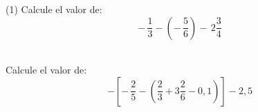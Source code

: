 \documentclass[]{srs}
\begin{document}
\begin{preguntas}(1)
  \pregunta Calcule el valor de:\\[-5pt]
  \begin{equation*}
   -\,\dfrac{1}{3} - \left(-\,\dfrac{5}{6}\right) -\,2\dfrac{3}{4}
  \end{equation*}\\[-20pt]
  \begin{malla}[height=9cm]
  \end{malla}
  \pregunta Calcule el valor de:\\[-5pt]
  \begin{equation*}
    -\left[-\,\dfrac{2}{5}-\left(\dfrac{2}{3} + 3\dfrac{2}{6} - 0,1\right)\right] - 2,5
  \end{equation*}\\[-20pt]
  \begin{malla}[height=13cm]
  \end{malla}
\end{preguntas}
\end{document}
